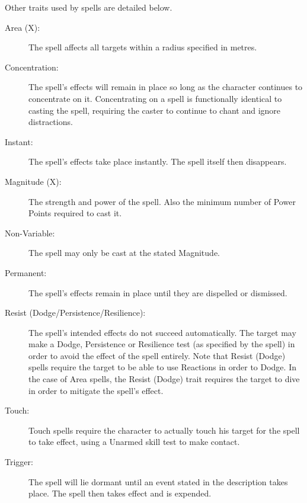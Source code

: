 Other traits used by spells are detailed below. 
\begin{description}
	\item[Area (X):] The spell affects all targets within a radius specified in metres. 
	\item[Concentration:] The spell’s effects will remain in place so long as the character continues to concentrate on it. Concentrating on a spell is functionally identical to casting the spell, requiring the caster to continue to chant and ignore distractions. 
	\item[Instant:] The spell’s effects take place instantly. The spell itself then disappears. 
	\item[Magnitude (X):] The strength and power of the spell. Also the minimum number of Power Points required to cast it. 
	\item[Non-Variable:] The spell may only be cast at the stated Magnitude.
	\item[Permanent:] The spell’s effects remain in place until they are dispelled or dismissed. 
	\item[Resist (Dodge/Persistence/Resilience):] The spell’s intended effects do not succeed automatically. The target may make a Dodge, Persistence or Resilience test (as specified by the spell) in order to avoid the effect of the spell entirely. Note that Resist (Dodge) spells require the target to be able to use Reactions in order to Dodge. In the case of Area spells, the Resist (Dodge) trait requires the target to dive in order to mitigate the spell’s effect. 
	\item[Touch:] Touch spells require the character to actually touch his target for the spell to take effect, using a Unarmed skill test to make contact. %
	\item[Trigger:] The spell will lie dormant until an event stated in the description takes place. The spell then takes effect and is expended.
\end{description}




